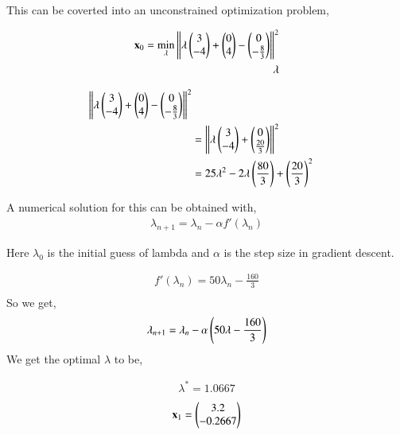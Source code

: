 \documentclass[journal,12pt,twocolumn]{IEEEtran}
\renewcommand\thesection{\arabic{section}}
\begin{document}
\begin{enumerate}
This can be coverted into an unconstrained optimization problem,
	
		\begin{align}
			\mathbf{x}_0 = \min_{\mathbf{\lambda}} \left\lVert\lambda \begin{pmatrix}3\\-4\end{pmatrix}+\begin{pmatrix}0\\4\end{pmatrix}-\begin{pmatrix}0\\-\frac{8}{3}\end{pmatrix}\right\rVert^2\\
			\lambda
		\end{align}

		\begin{align}
			\left\lVert\lambda \begin{pmatrix}3\\-4\end{pmatrix}+\begin{pmatrix}0\\4\end{pmatrix}-\begin{pmatrix}0\\-\frac{8}{3}\end{pmatrix}\right\rVert^2\\
			&= \left\lVert\lambda \begin{pmatrix}3\\-4\end{pmatrix}+\begin{pmatrix}0\\\frac{20}{3}\end{pmatrix}\right\rVert^2\\
			&= 25\lambda^2 -2\lambda \left(\frac{80}{3}\right)+\left(\frac{20}{3}\right)^2
		\end{align}

A numerical solution for this can be obtained with,
		\begin{align}
			\lambda_{n+1} = \lambda_n - \alpha f'(\lambda_n)
		\end{align}

Here $\lambda_0$ is the initial guess of lambda and $\alpha$ is the step size in gradient descent.

		\begin{align}
			f'(\lambda_n) = 50\lambda_n-\frac{160}{3}\\
		\end{align}
So we get,
		\begin{align}
			\lambda_{n+1} = \lambda_n - \alpha \left(50\lambda-\frac{160}{3}\right) 
		\end{align}
We get the optimal $\lambda$ to be,

		\begin{align}
			\lambda^* = 1.0667
		\end{align}
\begin{align}
	\mathbf{x}_1 = \begin{pmatrix}3.2\\-0.2667\end{pmatrix}
\end{align}
		\begin{table}[h]
			\centering
			
			\caption{}
			\label{tab:2}
		\end{table}

\end{enumerate}

%
\end{document}
